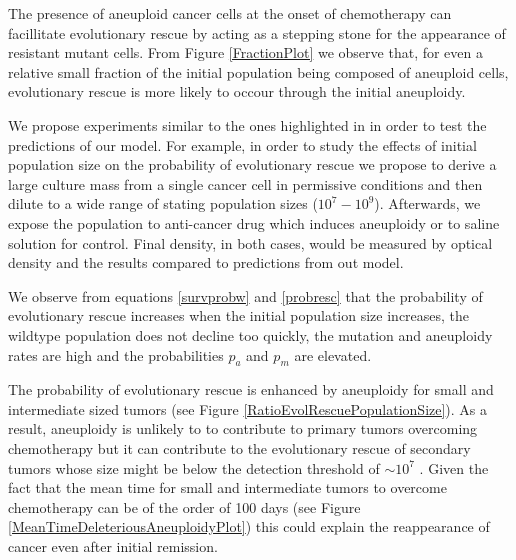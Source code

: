 \documentclass[12pt]{extarticle}
\begin{document}
The presence of aneuploid cancer cells at the onset of chemotherapy can facillitate evolutionary rescue by acting as a stepping stone for the appearance of resistant mutant cells. From Figure \ref{FractionPlot} we observe that, for even a relative small fraction of the initial population being composed of aneuploid cells, evolutionary rescue is more likely to occour through the initial aneuploidy.

We propose experiments similar to the ones highlighted in \cite{martin2013probability} in order to test the predictions of our model. For example, in order to study the effects of initial population size on the probability of evolutionary rescue we propose to derive a large culture mass from a single cancer cell in permissive conditions and then dilute to a wide range of stating population sizes ($10^7-10^9$). Afterwards, we expose the population to anti-cancer drug which induces aneuploidy or to saline solution for control. Final density, in both cases, would be measured by optical density and the results compared to predictions from out model.

We observe from equations \eqref{survprobw} and \eqref{probresc} that the probability of evolutionary rescue increases when the initial population size increases, the wildtype population does not decline too quickly, the mutation and aneuploidy rates are high and the probabilities $p_a$ and $p_m$ are elevated.

The probability of evolutionary rescue is enhanced by aneuploidy for small and intermediate sized tumors (see Figure \ref{RatioEvolRescuePopulationSize}). As a result, aneuploidy is unlikely to to contribute to primary tumors overcoming chemotherapy but it can contribute to the evolutionary rescue of secondary tumors whose size might be below the detection threshold of $\sim10^7$  \cite{bozic2013evolutionary}. Given the fact that the mean time for small and intermediate tumors to overcome chemotherapy can be of the order of 100 days (see Figure \ref{MeanTimeDeleteriousAneuploidyPlot})  this could explain the reappearance of cancer even after initial remission.


\nolinenumbers
%
%
%


\pagebreak
\end{document}
